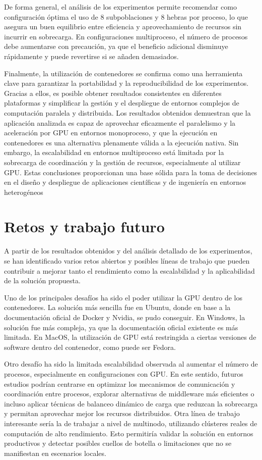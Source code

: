 De forma general, el análisis de los experimentos permite recomendar como configuración óptima el uso de 8 subpoblaciones y 8 hebras por proceso, lo que asegura un buen equilibrio entre eficiencia y aprovechamiento de recursos sin incurrir en sobrecarga. En configuraciones multiproceso, el número de procesos debe aumentarse con precaución, ya que el beneficio adicional disminuye rápidamente y puede revertirse si se añaden demasiados.

Finalmente, la utilización de contenedores se confirma como una herramienta clave para garantizar la portabilidad y la reproducibilidad de los experimentos. Gracias a ellos, es posible obtener resultados consistentes en diferentes plataformas y simplificar la gestión y el despliegue de entornos complejos de computación paralela y distribuida. Los resultados obtenidos demuestran que la aplicación analizada es capaz de aprovechar eficazmente el paralelismo y la aceleración por GPU en entornos monoproceso, y que la ejecución en contenedores es una alternativa plenamente válida a la ejecución nativa. Sin embargo, la escalabilidad en entornos multiproceso está limitada por la sobrecarga de coordinación y la gestión de recursos, especialmente al utilizar GPU. Estas conclusiones proporcionan una base sólida para la toma de decisiones en el diseño y despliegue de aplicaciones científicas y de ingeniería en entornos heterogéneos

\section{Retos y trabajo futuro}

A partir de los resultados obtenidos y del análisis detallado de los experimentos, se han identificado varios retos abiertos y posibles líneas de trabajo que pueden contribuir a mejorar tanto el rendimiento como la escalabilidad y la aplicabilidad de la solución propuesta.

Uno de los principales desafíos ha sido el poder utilizar la GPU dentro de los contenedores. La solución más sencilla fue en Ubuntu, donde en base a la documentación oficial de Docker y Nvidia, se pudo conseguir. En Windows, la solución fue más compleja, ya que la documentación oficial existente es más limitada. En MacOS, la utilización de GPU está restringida a ciertas versiones de software dentro del contenedor, como puede ser Fedora.

Otro desafío ha sido la limitada escalabilidad observada al aumentar el número de procesos, especialmente en configuraciones con GPU. En este sentido, futuros estudios podrían centrarse en optimizar los mecanismos de comunicación y coordinación entre procesos, explorar alternativas de middleware más eficientes o incluso aplicar técnicas de balanceo dinámico de carga que reduzcan la sobrecarga y permitan aprovechar mejor los recursos distribuidos. Otra línea de trabajo interesante sería la de trabajar a nivel de multinodo, utilizando clústeres reales de computación de alto rendimiento. Esto permitiría validar la solución en entornos productivos y detectar posibles cuellos de botella o limitaciones que no se manifiestan en escenarios locales.

